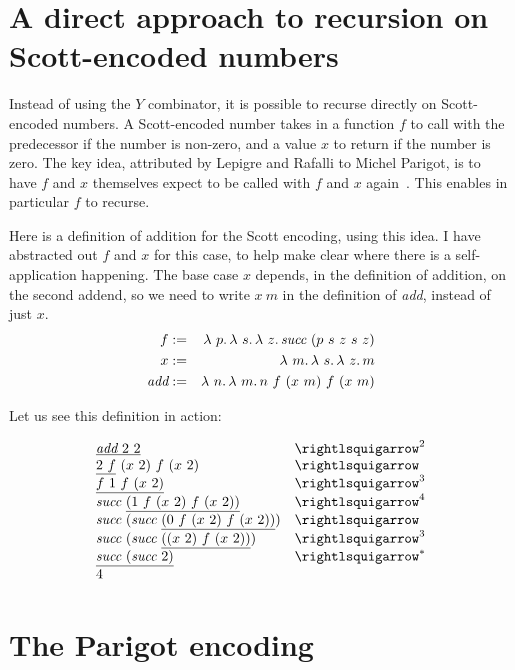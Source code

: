 \section{A direct approach to recursion on Scott-encoded numbers}

Instead of using the $Y$ combinator, it is possible to recurse
directly on Scott-encoded numbers.  A Scott-encoded number takes in a
function $f$ to call with the predecessor if the number is non-zero,
and a value $x$ to return if the number is zero.  The key idea,
attributed by Lepigre and Rafalli to Michel Parigot, is to have $f$
and $x$ themselves expect to be called with $f$ and $x$
again~\cite{lepigre:rafalli19}.  This enables in particular $f$ to
recurse.

Here is a definition of addition for the Scott encoding,
using this idea. I have abstracted out $f$ and $x$ for this
case, to help make clear where there is a self-application
happening.  The base case $x$ depends, in the definition of addition,
on the second addend, so we need to write $x\ m$ in the definition
of \textit{add}, instead of just $x$.
\begin{eqnarray*}
f & := & \lam{p}{\lam{s}{\lam{z}{\textit{succ}\ (p\ s\ z\ s\ z)}}} \\
x & := & \ \lam{m}{\lam{s}{\lam{z}{m}}} \\
\textit{add} & := & \lam{n}{\lam{m}{n\ f\ (x\ m)\ f\ (x\ m)}}
\end{eqnarray*}

\noindent Let us see this definition in action:

\[
\begin{array}{ll}
  \underline{\textit{add}\ 2\ 2} & \betaa^2 \\
  \underline{2\ f}\ (x\ 2)\ f\ (x\ 2) & \betaa \\
  \underline{f\ 1\ f\ (x\ 2)} & \betaa^3 \\
  \textit{succ}\ \underline{(1\ f\ (x\ 2)\ f\ (x\ 2))} & \betaa^4 \\
  \textit{succ}\ (\textit{succ}\ \underline{(0\ f\ (x\ 2)\ f\ (x\ 2))}) & \betaa \\
  \textit{succ}\ (\textit{succ}\ \underline{((x\ 2)\ f\ (x\ 2))}) & \betaa^3 \\
  \underline{\textit{succ}\ (\textit{succ}\ 2)} & \betaa^* \\    
  4
\end{array}
  \]

\section{The Parigot encoding}

